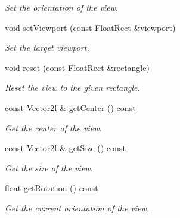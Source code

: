 \begin{DoxyCompactItemize}
\begin{DoxyCompactList}\small\item\em Set the orientation of the view. \end{DoxyCompactList}\item 
void \hyperlink{classsf_1_1_view_a8eaec46b7d332fe834f016d0187d4b4a}{set\-Viewport} (\hyperlink{term__entry_8h_a57bd63ce7f9a353488880e3de6692d5a}{const} \hyperlink{namespacesf_ab0d978f5903922a6bdfca1736b71ccc9}{Float\-Rect} \&viewport)
\begin{DoxyCompactList}\small\item\em Set the target viewport. \end{DoxyCompactList}\item 
void \hyperlink{classsf_1_1_view_ac95b636eafab3922b7e8304fb6c00d7d}{reset} (\hyperlink{term__entry_8h_a57bd63ce7f9a353488880e3de6692d5a}{const} \hyperlink{namespacesf_ab0d978f5903922a6bdfca1736b71ccc9}{Float\-Rect} \&rectangle)
\begin{DoxyCompactList}\small\item\em Reset the view to the given rectangle. \end{DoxyCompactList}\item 
\hyperlink{term__entry_8h_a57bd63ce7f9a353488880e3de6692d5a}{const} \hyperlink{namespacesf_a80cea3c46537294fd1d8d428566ad8b2}{Vector2f} \& \hyperlink{classsf_1_1_view_adae81dede405b91bb3c487e28f536fe9}{get\-Center} () \hyperlink{term__entry_8h_a57bd63ce7f9a353488880e3de6692d5a}{const} 
\begin{DoxyCompactList}\small\item\em Get the center of the view. \end{DoxyCompactList}\item 
\hyperlink{term__entry_8h_a57bd63ce7f9a353488880e3de6692d5a}{const} \hyperlink{namespacesf_a80cea3c46537294fd1d8d428566ad8b2}{Vector2f} \& \hyperlink{classsf_1_1_view_aa130cf34676d715242bee661537a6257}{get\-Size} () \hyperlink{term__entry_8h_a57bd63ce7f9a353488880e3de6692d5a}{const} 
\begin{DoxyCompactList}\small\item\em Get the size of the view. \end{DoxyCompactList}\item 
float \hyperlink{classsf_1_1_view_a8ad320469a27f96f6f49de1c14f0978d}{get\-Rotation} () \hyperlink{term__entry_8h_a57bd63ce7f9a353488880e3de6692d5a}{const} 
\begin{DoxyCompactList}\small\item\em Get the current orientation of the view. \end{DoxyCompactList}\item 

\end{DoxyCompactItemize}
